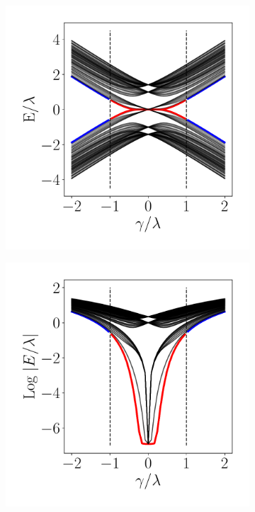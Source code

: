 \begin{figure}[h!]
     \centering
    \captionsetup[sub]{font=small}
     \begin{subfigure}[b!]{0.24 \textwidth}
         \caption{}
         \includegraphics[width=\textwidth]{Imagenes/Resultados_Hoti_Fractal/bands_square_shh.pdf}
     \end{subfigure}\hspace*{-0.5em}
     \begin{subfigure}[b!]{0.24 \textwidth}
         \caption{}
         \includegraphics[width=\textwidth]{Imagenes/Resultados_Hoti_Fractal/bands_square_shh_log.pdf}

\end{subfigure}
\end{figure}
